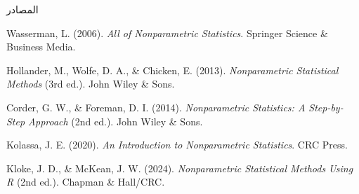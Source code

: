 		\begin{frame}{المصادر}
			\begin{thebibliography}{9}
				\begin{english}
					Wasserman, L. (2006).
					\textit{All of Nonparametric Statistics}.
					Springer Science \& Business Media.
					
					Hollander, M., Wolfe, D. A., \& Chicken, E. (2013).
					\textit{Nonparametric Statistical Methods} (3rd ed.).
					John Wiley \& Sons.
					
					Corder, G. W., \& Foreman, D. I. (2014).
					\textit{Nonparametric Statistics: A Step-by-Step Approach} (2nd ed.).
					John Wiley \& Sons.
					
					Kolassa, J. E. (2020).
					\textit{An Introduction to Nonparametric Statistics}.
					CRC Press.
					
					Kloke, J. D., \& McKean, J. W. (2024).
					\textit{Nonparametric Statistical Methods Using R} (2nd ed.).
					Chapman \& Hall/CRC.
				\end{english}
			\end{thebibliography}
		\end{frame}
		
